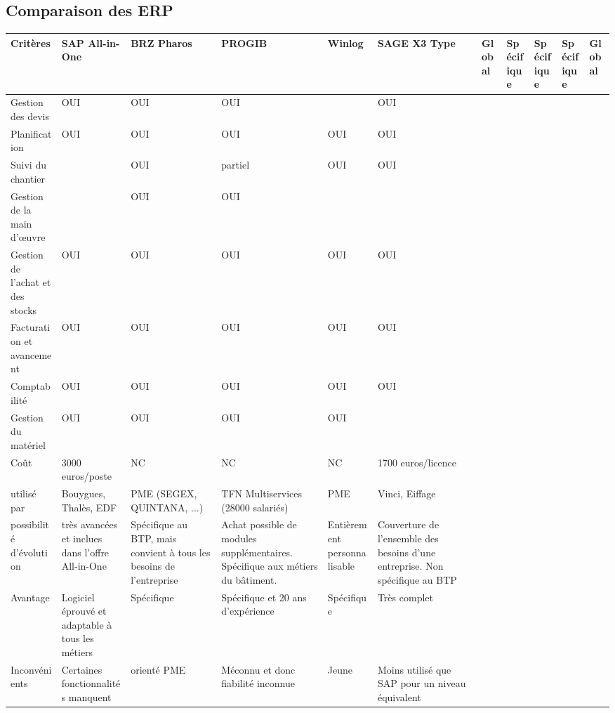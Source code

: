 \pagebreak
\subsection{Comparaison des ERP}

\hskip -15mm
\begin{longtable}{|m{2cm}|m{25mm}|m{25mm}|m{25mm}|m{25mm}|m{25mm}|}
\hline
Critères&SAP All-in-One&BRZ Pharos&PROGIB&Winlog&SAGE X3\endhead
\hline
Type&Global&Spécifique&Spécifique&Spécifique&Global\\
\hline
Gestion des devis&OUI&OUI&OUI&&OUI\\
\hline
Planification &OUI&OUI&OUI&OUI&OUI\\
\hline
Suivi du chantier&&OUI&partiel&OUI&OUI\\
\hline
Gestion de la main d’œuvre&&OUI&OUI&&\\
\hline
Gestion de l’achat et des stocks&OUI&OUI&OUI&OUI&OUI\\
\hline
Facturation et avancement&OUI&OUI&OUI&OUI&OUI\\
\hline
Comptabilité&OUI&OUI&OUI&OUI&OUI\\
\hline
Gestion du matériel&OUI&OUI&OUI&OUI&\\
\hline
Coût&3000 euros/poste&NC&NC&NC&1700 euros/licence\\
\hline
utilisé par&Bouygues, Thalès, EDF&PME (SEGEX, QUINTANA, ...)
&TFN Multiservices (28000 salariés)&PME&Vinci, Eiffage\\
\hline
possibilité d'évolution&très avancées et inclues dans l'offre All-in-One
&Spécifique au BTP, mais convient à tous les besoins de l'entreprise
&Achat possible de modules supplémentaires.
Spécifique aux métiers du bâtiment.
&Entièrement personnalisable&Couverture de l'ensemble des besoins
d'une entreprise. Non spécifique au BTP\\
\hline
Avantage&Logiciel éprouvé et adaptable à tous les métiers&Spécifique
&Spécifique et 20 ans d'expérience&Spécifique&Très complet\\
\hline
Inconvénients&Certaines fonctionnalités manquent&orienté PME
&Méconnu et donc fiabilité inconnue&Jeune
&Moins utilisé que SAP pour un niveau équivalent\\
\hline
\end{longtable}
\vfil
\pagebreak
